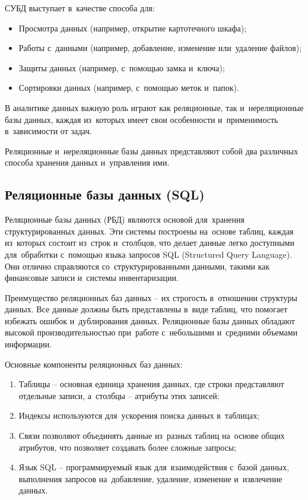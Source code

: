 \documentclass{ou}
\begin{document}
СУБД выступает в~качестве способа для:
\begin{itemize}[label=-, leftmargin=0em, itemindent=3.35em, nosep]
\item Просмотра данных (например, открытие картотечного шкафа);
\item Работы с~данными (например, добавление, изменение или~удаление файлов);
\item Защиты данных (например, с~помощью замка и~ключа);
\item Сортировки данных (например, с~помощью меток и~папок).
\end{itemize}

В аналитике данных важную роль играют как реляционные, так и~нереляционные базы данных, каждая из~которых имеет свои особенности и~применимость в~зависимости от задач.

Реляционные и~нереляционные базы данных представляют собой два различных способа хранения данных и~управления ими.

\subsection{Реляционные базы данных (SQL)}
Реляционные базы данных (РБД) являются основой для~хранения структурированных данных. Эти системы построены на~основе таблиц, каждая из~которых состоит из~строк и~столбцов, что делает данные легко доступными для~обработки с~помощью языка запросов SQL (Structured Query Language). Они отлично справляются со~структурированными данными, такими как финансовые записи и~системы инвентаризации.

Преимущество реляционных баз данных -- их строгость в~отношении структуры данных. Все данные должны быть представлены в~виде таблиц, что помогает избежать ошибок и~дублирования данных. Реляционные базы данных обладают высокой производительностью при~работе с~небольшими и~средними объемами информации.

Основные компоненты реляционных баз данных:
\begin{enumerate}[leftmargin=0em, itemindent=3.75em, nosep, label=\arabic*)]
\item Таблицы -- основная единица хранения данных, где строки представляют отдельные записи, а~столбцы -- атрибуты этих записей;
\item Индексы используются для~ускорения поиска данных в~таблицах;
\item Связи позволяют объединять данные из~разных таблиц на~основе общих атрибутов, что позволяет создавать более сложные запросы;
\item Язык SQL -- программируемый язык для~взаимодействия с~базой данных, выполнения запросов на~добавление, удаление, изменение и~извлечение данных.
\end{enumerate}
\end{document}
